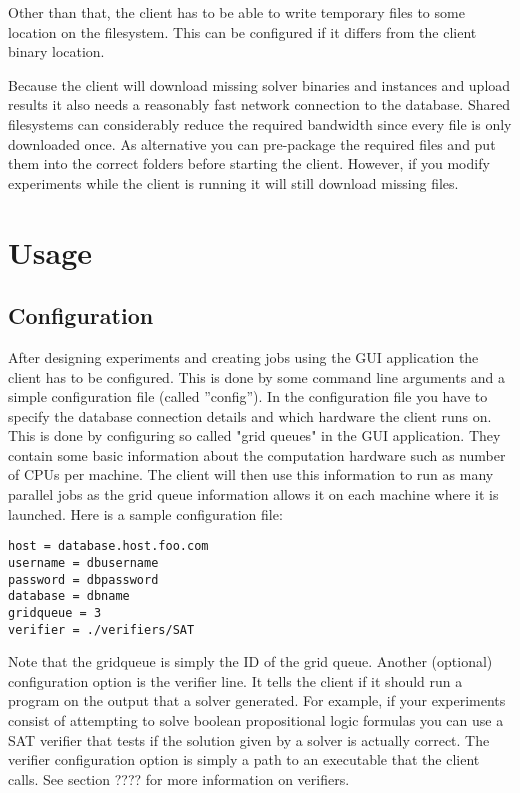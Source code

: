 \documentclass{article}
\begin{document}
Other than that, the client has to be able to write temporary files to some location on the filesystem. This can be configured if it differs from the client binary location.

Because the client will download missing solver binaries and instances and upload results it also needs a reasonably fast network connection to the database. Shared filesystems
can considerably reduce the required bandwidth since every file is only downloaded once. As alternative you can pre-package the required files and put them into the correct folders
before starting the client. However, if you modify experiments while the client is running it will still download missing files.

\newpage
\section{Usage}
\subsection{Configuration}
After designing experiments and creating jobs using the GUI application the client has to be configured. This is done by some command line arguments and a simple configuration file (called ''config'').
In the configuration file you have to specify the database connection details and which hardware the client runs on. This is done by configuring so called "grid queues" in the GUI application.
They contain some basic information about the computation hardware such as number of CPUs per machine. The client will then use this information to run as many parallel jobs as
the grid queue information allows it on each machine where it is launched. Here is a sample configuration file:
\begin{verbatim}
host = database.host.foo.com
username = dbusername
password = dbpassword
database = dbname
gridqueue = 3
verifier = ./verifiers/SAT
\end{verbatim}
Note that the gridqueue is simply the ID of the grid queue. Another (optional) configuration option is the verifier line. It tells the client if it should run a program on the output that a
solver generated. For example, if your experiments consist of attempting to solve boolean propositional logic formulas you can use a SAT verifier that tests if the solution given by a solver
is actually correct. The verifier configuration option is simply a path to an executable that the client calls. See section ???? for more information on verifiers.
\end{document}
